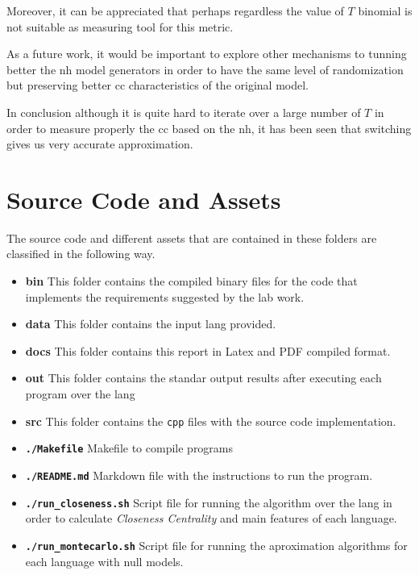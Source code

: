 \documentclass[12pt, a4paper]{article}
\begin{document}
Moreover, it can be appreciated that perhaps regardless the value of $T$ \acrshort{binomial} is not suitable as measuring tool for this
metric.

As a future work, it would be important to explore other mechanisms to tunning better the \acrshort{nh} model generators in order
to have the same level of randomization but preserving better \acrshort{cc} characteristics of the original model.

In conclusion although it is quite hard to iterate over a large number of $T$ in order to measure properly the \acrshort{cc} based on the \acrshort{nh},
it has been seen that \acrshort{switching} gives us very accurate approximation.

\printglossary[type=\acronymtype]

\appendix\label{apx:org}
\section{Source Code and Assets}
The source code and different assets that are contained in these folders are classified in the following way.

\begin{itemize}
    \item \textbf{bin} This folder contains the compiled binary files for the code that implements the requirements suggested by the lab work.
    \item \textbf{data} This folder contains the input \acrshort{lang} provided.
    \item \textbf{docs} This folder contains this report in Latex and PDF compiled format.
    \item \textbf{out} This folder contains the standar output results after executing each program over the \acrshort{lang}
    \item \textbf{src} This folder contains the \texttt{cpp} files with the source code implementation.
    \item \textbf{\texttt{./Makefile}} Makefile to compile programs
    \item \textbf{\texttt{./README.md}} Markdown file with the instructions to run the program.
    \item \textbf{\texttt{./run_closeness.sh}} Script file for running the algorithm over the \acrshort{lang} in order to calculate \textit{Closeness Centrality} and 
    main features of each language.
    \item \textbf{\texttt{./run_montecarlo.sh}} Script file for running the aproximation algorithms for each language with null models.
\end{itemize}
\end{document}
